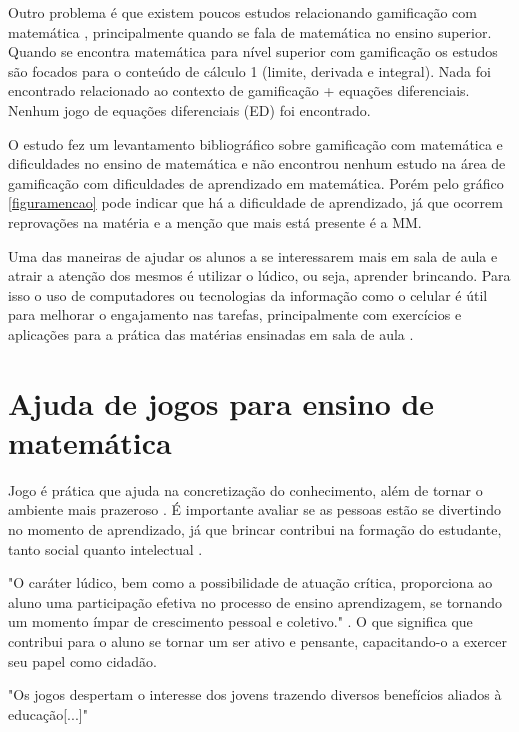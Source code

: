 Outro problema é que existem poucos estudos relacionando gamificação com matemática \cite{revbibmatgam}, principalmente quando se fala de matemática no ensino superior. Quando se encontra matemática para nível superior com gamificação os estudos são focados para o conteúdo de cálculo 1 (limite, derivada e integral). Nada foi encontrado relacionado ao contexto de gamificação + equações diferenciais. Nenhum jogo de equações diferenciais (ED) foi encontrado.

O estudo \cite{revbibmatgam} fez um levantamento bibliográfico sobre gamificação com matemática e dificuldades no ensino de matemática e não encontrou nenhum estudo na área de gamificação com dificuldades de aprendizado em matemática. Porém pelo gráfico \ref{figuramencao} pode indicar que há a dificuldade de aprendizado, já que ocorrem reprovações na matéria e a menção que mais está presente é a MM.

Uma das maneiras de ajudar os alunos a se interessarem mais em sala de aula e atrair a atenção dos mesmos é utilizar o lúdico, ou seja, aprender brincando. Para isso o uso de computadores ou tecnologias da informação como o celular é útil para melhorar o engajamento nas tarefas, principalmente com exercícios e aplicações para a prática das matérias ensinadas em sala de aula \cite{tdahNasEscolas2}.


\section[Ajuda de jogos para ensino de matemática]{Ajuda de jogos para ensino de matemática}
Jogo é prática que ajuda na concretização do conhecimento, além de tornar o ambiente mais prazeroso \cite{jogoPratPedagoc}. É importante avaliar se as pessoas estão se divertindo no momento de aprendizado, já que brincar contribui na formação do estudante, tanto social quanto intelectual \cite{jogoPratPedagoc}.

"O caráter lúdico, bem como a possibilidade de atuação crítica, proporciona ao aluno uma participação efetiva no processo de ensino aprendizagem, se tornando um momento ímpar de crescimento pessoal e coletivo."  \cite{jogoPratPedagoc}. O que significa que contribui para o aluno se tornar um ser ativo e pensante, capacitando-o a exercer seu papel como cidadão.

"Os jogos despertam o interesse dos jovens trazendo diversos benefícios aliados à
educação[...]" \cite{appcalculo}

\begin{comment}
Gamificação foca em elementos como desafios, níveis, avatar, conquistas, histórias, pontos (Gustavo Fortes Tondello, PhD). Esses elementos são utilizados para engajamento do jogador.

Completar missões e derrotar um chefão faz o jogador se sentir competente (Gustavo Fortes Tondello, PhD).
Ser capaz de escolher diferentes caminhos ou criar coisas diferentes faz o jogador se sentir autônomo (Gustavo Fortes Tondello, PhD).
\end{comment}

